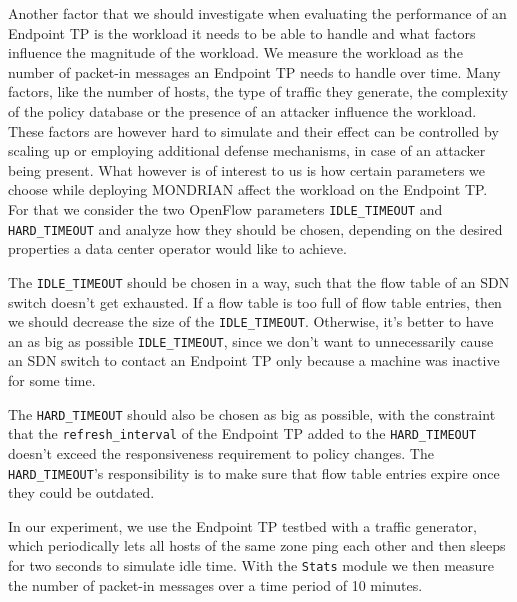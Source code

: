 Another factor that we should investigate when evaluating the performance of an Endpoint \acs{TP} is the workload it needs to be able to handle and what factors influence the magnitude of the workload. We measure the workload as the number of packet-in messages an Endpoint \acs{TP} needs to handle over time. Many factors, like the number of hosts, the type of traffic they generate, the complexity of the policy database or the presence of an attacker influence the workload. These factors are however hard to simulate and their effect can be controlled by scaling up or employing additional defense mechanisms, in case of an attacker being present. What however is of interest to us is how certain parameters we choose while deploying MONDRIAN affect the workload on the Endpoint \acs{TP}. For that we consider the two OpenFlow parameters \texttt{IDLE_TIMEOUT} and \texttt{HARD_TIMEOUT} and analyze how they should be chosen, depending on the desired properties a data center operator would like to achieve.

The \texttt{IDLE_TIMEOUT} should be chosen in a way, such that the flow table of an \acs{SDN} switch doesn't get exhausted. If a flow table is too full of flow table entries, then we should decrease the size of the \texttt{IDLE_TIMEOUT}. Otherwise, it's better to have an as big as possible \texttt{IDLE_TIMEOUT}, since we don't want to unnecessarily cause an \acs{SDN} switch to contact an Endpoint \acs{TP} only because a machine was inactive for some time. 

The \texttt{HARD_TIMEOUT} should also be chosen as big as possible, with the constraint that the \texttt{refresh_interval} of the Endpoint \acs{TP} added to the \texttt{HARD_TIMEOUT} doesn't exceed the responsiveness requirement to policy changes. The \texttt{HARD_TIMEOUT}'s responsibility is to make sure that flow table entries expire once they could be outdated.

In our experiment, we use the Endpoint \acs{TP} testbed with a traffic generator, which periodically lets all hosts of the same zone ping each other and then sleeps for two seconds to simulate idle time. With the \texttt{Stats} module we then measure the number of packet-in messages over a time period of 10 minutes.

